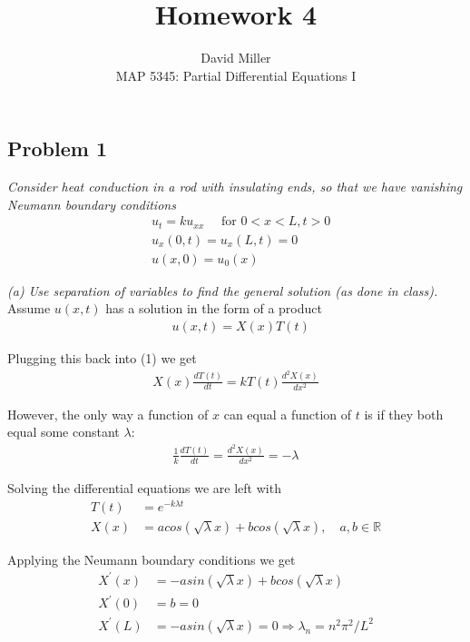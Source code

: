 \documentclass[10pt]{article}
\theoremstyle{remark}
\begin{document}
 
\title{Homework 4}
\author{David Miller \\ 
MAP 5345: Partial Differential Equations I} 
 
\maketitle

\subsection*{Problem 1}

\textit{Consider heat conduction in a rod with insulating ends, so that we have vanishing Neumann boundary conditions}
\begin{align}
	& u_t = ku_{xx} \quad \text{ for } 0 < x < L, t > 0 \\
	& u_x(0,t) = u_x(L,t) = 0 \\
	& u(x,0) = u_0(x)
\end{align}

\textit{(a) Use separation of variables to find the general solution (as done in class).} \\ 

Assume $u(x,t)$ has a solution in the form of a product
\begin{align*}
	& u(x,t) = X(x)T(t)
\end{align*}

Plugging this back into (1) we get
\begin{align*}
	X(x)\frac{dT(t)}{dt} = kT(t)\frac{d^2 X(x)}{dx^2}
\end{align*}

However, the only way a function of $x$ can equal a function of $t$ is if they both equal some constant $\lambda$:
\begin{align*}
	\frac{1}{k}\frac{dT(t)}{dt} = \frac{d^2X(x)}{dx^2} = -\lambda
\end{align*}

Solving the differential equations we are left with
\begin{align*}
	T(t) & = e^{-k\lambda t} \\
	X(x) & = a cos(\sqrt{\lambda}x) + bcos(\sqrt{\lambda} x), \quad a,b \in \mathbb{R}
\end{align*}

Applying the Neumann boundary conditions we get
\begin{align*}
	X^\prime(x) & = -asin(\sqrt{\lambda} x) + bcos(\sqrt{\lambda} x) \\
	X^\prime(0) & = b = 0 \\
	X^\prime(L) & = -asin(\sqrt{\lambda} x) = 0 \Rightarrow \lambda_n  = n^2\pi^2/L^2
\end{align*}
\end{document}
